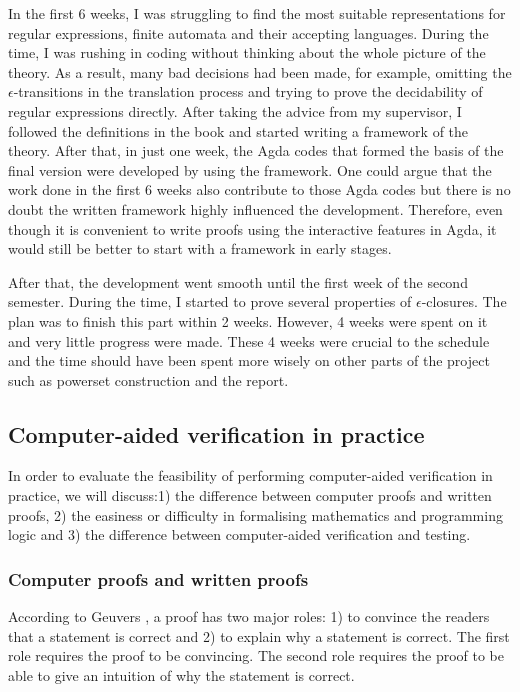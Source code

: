\par In the first 6 weeks, I was struggling to find
the most suitable representations for regular expressions, finite
automata and their accepting languages. During the time, I was
rushing in coding without thinking about the whole picture of
the theory. As a result, many bad decisions had been made, for example, omitting the
\(\epsilon\)-transitions in the translation process and trying to prove
the decidability of regular expressions directly. After taking the
advice from my supervisor, I followed the definitions in the
book \cite{aho1972} and started writing a framework of the
theory. After that, in just one week, the Agda
codes that formed the basis of the final version were developed by
using the framework. One could argue that the work
done in the first 6 weeks also contribute to those Agda codes but
there is no doubt the written framework highly influenced the
development. Therefore, even though it is convenient to write proofs
using the interactive features in Agda,
it would still be better to start with a framework in early stages. 

\par After that, the development went smooth until the first week of
the second semester. During the time, I started to prove several
properties of \(\epsilon\)-closures. The plan was to finish this part
within 2 weeks. However, 4 weeks were spent on it and very little
progress were made. These 4 weeks were crucial to the schedule and
the time should have been spent more wisely on other parts of the
project such as powerset construction and the report. 


\subsection{Computer-aided verification in practice}
\par In order to evaluate the feasibility of performing computer-aided verification in
practice, we will discuss:1) the difference between computer proofs and written proofs, 2) the easiness or
difficulty in formalising mathematics and programming logic and 3) the
difference between computer-aided verification and testing. 


\subsubsection{Computer proofs and written proofs}
\par According to Geuvers \cite{geuvers2009}, a proof has two major roles: 1)
to convince the readers that a statement is correct and 2) to explain
why a statement is correct. The first role requires the proof to be
convincing. The second role requires the proof to be able to give an
intuition of why the statement is correct. 

